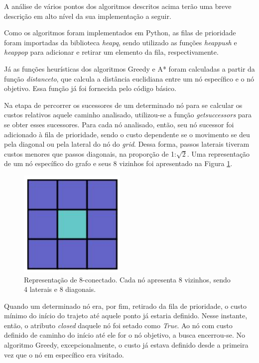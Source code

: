 \documentclass[conference]{IEEEtran}
\begin{document}
A análise de vários pontos dos algoritmos descritos acima terão uma breve descrição em alto nível da sua implementação a seguir. 

Como os algoritmos foram implementados em Python, as filas de prioridade foram importadas da biblioteca \textit{heapq}, sendo utilizado as funções \textit{heappush} e \textit{heappop} para adicionar e retirar um elemento da fila, respectivamente.

Já as funções heurísticas dos algoritmos Greedy e A* foram calculadas a partir da função \textit{distance\underline{\space}to}, que calcula a distância euclidiana entre um nó específico e o nó objetivo. Essa função já foi fornecida pelo código básico.

Na etapa de percorrer os sucessores de um determinado nó para se calcular os custos relativos aquele caminho analisado, utilizou-se a função \textit{get\underline{\space}successors} para se obter esses sucessores. Para cada nó analisado, então, seu nó sucessor foi adicionado à fila de prioridade, sendo o custo dependente se o movimento se deu pela diagonal ou pela lateral do nó do \textit{grid}. Dessa forma, passos laterais tiveram custos menores que passos diagonais, na proporção de 1:$\sqrt{2}$. Uma representação de um nó específico do grafo e seus 8 vizinhos foi apresentado na Figura \ref{8-conectado}.

\begin{figure}[htbp]
\centerline{\includegraphics[scale=0.4]{8-conectado.png}}
\caption{Representação de 8-conectado. Cada nó apresenta 8 vizinhos, sendo 4 laterais e 8 diagonais.}
\label{8-conectado}
\end{figure}

Quando um determinado nó era, por fim, retirado da fila de prioridade, o custo mínimo do início do trajeto até aquele ponto já estaria definido. Nesse instante, então, o atributo \textit{closed} daquele nó foi setado como \textit{True}. Ao nó com custo definido de caminho do início até ele for o nó objetivo, a busca encerrou-se. No algoritmo Greedy, excepcionalmente, o custo já estava definido desde a primeira vez que o nó em específico era visitado.
\end{document}
